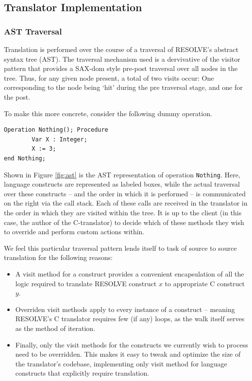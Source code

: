 \documentclass{sig-alternate}
\begin{document}

\subsection{Translator Implementation}

\subsubsection{AST Traversal}
Translation is performed over the course of a traversal of RESOLVE's abstract syntax tree (AST). The traversal mechanism used is a dervivative of the visitor pattern that provides a SAX-dom style pre-post traversal over all nodes in the tree. Thus, for any given node present, a total of two visits occur: One corresponding to the node being `hit' during the pre traversal stage, and one for the post. 

To make this more concrete, consider the following dummy operation.

\begin{verbatim}
Operation Nothing(); Procedure
        Var X : Integer;
        X := 3;
end Nothing;
\end{verbatim}

Shown in Figure \ref{fig:ast} is the AST representation of operation \texttt{Nothing}. Here, language constructs are represented as labeled boxes, while the actual traversal over these constructs -- and the order in which it is performed -- is communicated on the right via the call stack. Each of these calls are received in the translator in the order in which they are visited within the tree. It is up to the client (in this case, the author of the C-translator) to decide which of these methods they wish to override and perform custom actions within. 

We feel this particular traversal pattern lends itself to task of source to source translation for the following reasons:

\begin{itemize}
\item A visit method for a construct provides a convenient encapsulation of all the logic required to translate RESOLVE construct $x$ to appropriate C construct $y$.

\item Overriden visit methods apply to every instance of a construct -- meaning RESOLVE's C translator requires few (if any) loops, as the walk itself serves as the method of iteration.

\item Finally, only the visit methods for the constructs we currently wish to process need to be overridden. This makes it easy to tweak and optimize the size of the translator's codebase, implementing only visit method for language constructs that explicitly require translation.  
\end{itemize}
\end{document}
